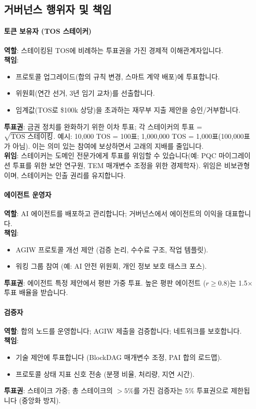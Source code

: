 \documentclass[11pt]{article}
\begin{document}
\subsection{거버넌스 행위자 및 책임}

\paragraph{토큰 보유자 (TOS 스테이커)}
\textbf{역할}: 스테이킹된 TOS에 비례하는 투표권을 가진 경제적 이해관계자입니다.\\
\textbf{책임}:
\begin{itemize}[noitemsep]
  \item 프로토콜 업그레이드(합의 규칙 변경, 스마트 계약 배포)에 투표합니다.
  \item 위원회(연간 선거, 3년 임기 교차)를 선출합니다.
  \item 임계값(TOS로 \$100k 상당)을 초과하는 재무부 지출 제안을 승인/거부합니다.
\end{itemize}
\textbf{투표권}: 금권 정치를 완화하기 위한 이차 투표; 각 스테이커의 투표 = $\sqrt{\text{TOS 스테이킹}}$. 예시: 10,000 TOS = 100표; 1,000,000 TOS = 1,000표(100,000표가 아님). 이는 의미 있는 참여에 보상하면서 고래의 지배를 줄입니다.\\
\textbf{위임}: 스테이커는 도메인 전문가에게 투표를 위임할 수 있습니다(예: PQC 마이그레이션 투표를 위한 보안 연구원, TEM 매개변수 조정을 위한 경제학자). 위임은 비보관형이며, 스테이커는 인출 권리를 유지합니다.

\paragraph{에이전트 운영자}
\textbf{역할}: AI 에이전트를 배포하고 관리합니다; 거버넌스에서 에이전트의 이익을 대표합니다.\\
\textbf{책임}:
\begin{itemize}[noitemsep]
  \item AGIW 프로토콜 개선 제안 (검증 논리, 수수료 구조, 작업 템플릿).
  \item 워킹 그룹 참여 (예: AI 안전 위원회, 개인 정보 보호 태스크 포스).
\end{itemize}
\textbf{투표권}: 에이전트 특정 제안에서 평판 가중 투표. 높은 평판 에이전트 ($r \geq 0.8$)는 1.5$\times$ 투표 배율을 받습니다.

\paragraph{검증자}
\textbf{역할}: 합의 노드를 운영합니다; AGIW 제출을 검증합니다; 네트워크를 보호합니다.\\
\textbf{책임}:
\begin{itemize}[noitemsep]
  \item 기술 제안에 투표합니다 (BlockDAG 매개변수 조정, PAI 합의 로드맵).
  \item 프로토콜 상태 지표 신호 전송 (분쟁 비율, 처리량, 지연 시간).
\end{itemize}
\textbf{투표권}: 스테이크 가중; 총 스테이크의 $>5\%$를 가진 검증자는 5\% 투표권으로 제한됩니다 (중앙화 방지).
\end{document}
